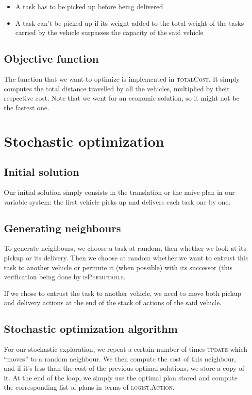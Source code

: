 \documentclass[11pt]{article}
\begin{document}
\begin{itemize}
\item A task has to be picked up before being delivered
\item A task can't be picked up if its weight added to the total weight of the tasks carried by the vehicle surpasses the capacity of the said vehicle
\end{itemize}

\subsection{Objective function}
The function that we want to optimize is implemented in \textsc{totalCost}. It simply computes the total distance travelled by all the vehicles, multiplied by their respective cost. Note that we went for an economic solution, so it might not be the fastest one.


\section{Stochastic optimization}

\subsection{Initial solution}
Our initial solution simply consists in the translation or the naive plan in our variable system: the first vehicle picks up and delivers each task one by one.

\subsection{Generating neighbours}
To generate neighbours, we choose a task at random, then whether we look at its pickup or its delivery. Then we choose at random whether we want to entrust this task to another vehicle or permute it (when possible) with its successor (this verification being done by \textsc{isPermutable}.

If we chose to entrust the task to another vehicle, we need to move both pickup and delivery actions at the end of the stack of actions of the said vehicle.

\subsection{Stochastic optimization algorithm}
For our stochastic exploration, we repeat a certain number of times \textsc{update} which ``moves'' to a random neighbour. We then compute the cost of this neighbour, and if it's less than the cost of the previous optimal solutions, we store a copy of it. At the end of the loop, we simply use the optimal plan stored and compute the corresponding list of plans in terms of \textsc{logist.Action}.
\end{document}
